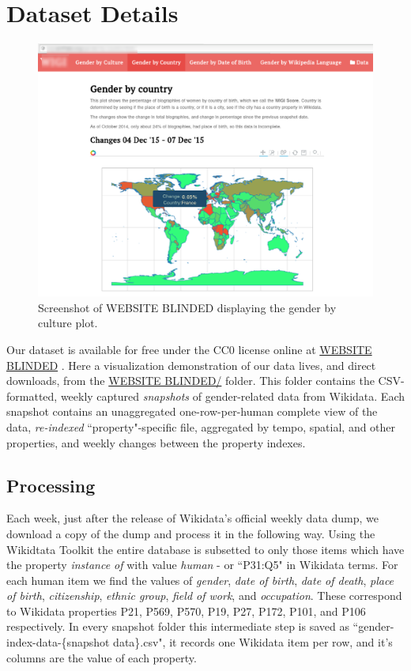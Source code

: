 \documentclass[letterpaper]{article}
\begin{document}
\section{Dataset Details}

\begin{figure}
\label{fig:screenshot}
\includegraphics[scale=0.2]{figures/website_screenshot.png} 
\caption{Screenshot of WEBSITE BLINDED displaying the gender by culture plot.}
\end{figure}

Our dataset is available for free under the CC0 license online at  \url{WEBSITE BLINDED} . Here a visualization demonstration of our data lives, and direct downloads, from the \url{WEBSITE BLINDED/} folder. 	This folder contains the CSV-formatted, weekly captured \textit{snapshots} of gender-related data from Wikidata. Each snapshot contains an unaggregated one-row-per-human complete view of the data, \textit{re-indexed} ``property"-specific file, aggregated by tempo, spatial, and other properties, and weekly changes between the property indexes.

\subsection{Processing}
Each week, just after the release of Wikidata's official weekly data dump, we download a copy of the dump and process it in the following way. Using the Wikidtata Toolkit \cite{kroetsch} the entire database is subsetted to only those items which have the property \textit{instance of} with value \textit{human} - or ``P31:Q5" in Wikidata terms. For each human item we find the values of \textit{gender}, \textit{date of birth}, \textit{date of death}, \textit{place of birth}, \textit{citizenship}, \textit{ethnic group}, \textit{field of work}, and \textit{occupation}. These correspond to Wikidata properties P21, P569, P570, P19, P27, P172, P101, and P106 respectively.  In every snapshot folder this intermediate step is saved as ``gender-index-data-\{snapshot data\}.csv", it records one Wikidata item per row, and it's columns are the value of each property.
 
\end{document}
